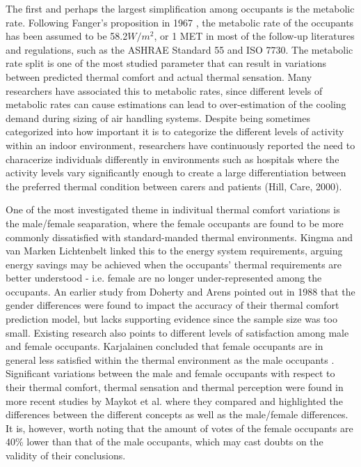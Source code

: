	The first and perhaps the largest simplification among occupants is the metabolic rate. Following Fanger's proposition in 1967 \cite{fanger_calculation_1967}, the metabolic rate of the occupants has been assumed to be 58.2$W/m^2$, or 1 MET in most of the follow-up literatures and regulations, such as the ASHRAE Standard 55\cite{ashrae_ansi/ashrae_2013} and ISO 7730\cite{iso_iso_2005}. 
    The metabolic rate split is one of the most studied parameter that can result in variations between predicted thermal comfort and actual thermal sensation. Many researchers have associated this to metabolic rates, since different levels of metabolic rates can cause estimations can lead to over-estimation of the cooling demand during sizing of air handling systems. Despite being sometimes categorized into how important it is to categorize the different levels of activity within an indoor environment\cite{rupp_associations_2018}, researchers have continuously reported the need to characerize individuals differently in environments such as hospitals where the activity levels vary significantly enough to create a large differentiation between the preferred thermal condition between carers and patients (Hill, Care, 2000). 

    One of the most investigated theme in indivitual thermal comfort variations is the male/female seaparation, where the female occupants are found to be more commonly dissatisfied with standard-manded thermal environments\cite{kingma_energy_2015}. Kingma and van Marken Lichtenbelt linked this to the energy system requirements, arguing energy savings may be achieved when the occupants' thermal requirements are better understood - i.e. female are no longer under-represented among the occupants\cite{kingma_energy_2015}. An earlier study from Doherty and Arens pointed out in 1988 that the gender differences were found to impact the accuracy of their thermal comfort prediction model, but lacks supporting evidence since the sample size was too small\cite{doherty_evaluation_1988}. Existing research also points to different levels of satisfaction among male and female occupants. Karjalainen concluded that female occupants are in general less satisfied within the thermal environment as the male occupants \cite{karjalainen_thermal_2012}. Significant variations between the male and female occupants with respect to their thermal comfort, thermal sensation and thermal perception were found in more recent studies by Maykot et al. where they compared and highlighted the differences between the different concepts as well as the male/female differences. It is, however, worth noting that the amount of votes of the female occupants are 40\% lower than that of the male occupants, which may cast doubts on the validity of their conclusions.



